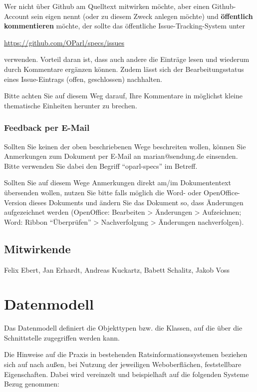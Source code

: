 \documentclass[,a4paper]{article}
\begin{document}
Wer nicht über Github am Quelltext mitwirken möchte, aber einen
Github-Account sein eigen nennt (oder zu diesem Zweck anlegen möchte)
und \textbf{öffentlich kommentieren} möchte, der sollte das öffentliche
Issue-Tracking-System unter

\href{https://github.com/OParl/specs/issues}{https://github.com/OParl/specs/issues}

verwenden. Vorteil daran ist, dass auch andere die Einträge lesen und
wiederum durch Kommentare ergänzen können. Zudem lässt sich der
Bearbeitungsstatus eines Issue-Eintrags (offen, geschlossen) nachhalten.

Bitte achten Sie auf diesem Weg darauf, Ihre Kommentare in möglichst
kleine thematische Einheiten herunter zu brechen.

\subsubsection{Feedback per E-Mail}

Sollten Sie keinen der oben beschriebenen Wege beschreiten wollen,
können Sie Anmerkungen zum Dokument per E-Mail an marian@sendung.de
einsenden. Bitte verwenden Sie dabei den Begriff ``oparl-specs'' im
Betreff.

Sollten Sie auf diesem Wege Anmerkungen direkt am/im Dokumententext
übersenden wollen, nutzen Sie bitte falls möglich die Word- oder
OpenOffice-Version dieses Dokuments und ändern Sie das Dokument so, dass
Änderungen aufgezeichnet werden (OpenOffice: Bearbeiten \textgreater{}
Änderungen \textgreater{} Aufzeichnen; Word: Ribbon ``Überprüfen''
\textgreater{} Nachverfolgung \textgreater{} Änderungen nachverfolgen).

\subsection{Mitwirkende}

Felix Ebert, Jan Erhardt, Andreas Kuckartz, Babett Schalitz, Jakob Voss

\section{Datenmodell}

Das Datenmodell definiert die Objekttypen bzw. die Klassen, auf die über
die Schnittstelle zugegriffen werden kann.

Die Hinweise auf die Praxis in bestehenden Ratsinformationssystemen
beziehen sich auf nach außen, bei Nutzung der jeweiligen Weboberflächen,
feststellbare Eigenschaften. Dabei wird vereinzelt und beispielhaft auf
die folgenden Systeme Bezug genommen:
\end{document}
